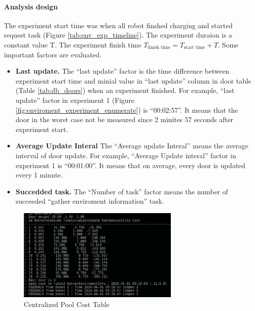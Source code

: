 \paragraph{Analysis design} The experiment start time was when all robot finshed charging and started request task (Figure \ref{tab:env_exp_timeline}). The experiment duraion is a constant value T. The experiment finish time $T_{\mbox{finish time}} = T_{\mbox{start time}} + T $. Some important factors are evaluated. 
\begin{itemize}
    \item \textbf{Last update.} The ``last update'' factor is the time difference between experiment start time and minial value in ``last update'' column in door table (Table \ref{tab:db_doors}) when an experiment finished. For example, ``last update'' factor in experiment 1 (Figure \ref{fig:enviroment_experiment_enumerate}) is ``00:02:57''. It means that the door in the worst case not be measured since 2 minites 57 seconds after experiment start.
    \item \textbf{Average Update Interal} The ``Average update Interal'' means the average interval of door update. For example, ``Average Update interal'' factor in experiment 1 is ``00:01:00''. It means that on average, every door is updated every 1 minute.
    \item \textbf{Succedded task.} The ``Number of task'' factor  means the number of succeeded ``gather enviroment information'' task.
\end{itemize}

\begin{figure}[htbp]
    \centering
    \includegraphics[width = 0.7\textwidth]{content/images/ch5/weight_analyze.png}
    \caption{Centralized Pool Cost Table}
    \label{fig:cost_table}
\end{figure}

